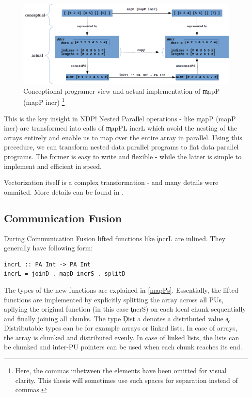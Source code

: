     \begin{figure}[h!]
        \begin{center}
        \includegraphics[width=\linewidth]{mapP.png}
        \caption{Conceptional programer view and actual implementation of \c{mapP (mapP incr)}
        \footnote{Here, the commas inbetween the elements have been omitted for visual clarity.
        This thesis will sometimes use such spaces for separation
        instead of commas.
        }
        }
        \label{figure:mapP}
        \end{center}
    \end{figure}
    
    This is the key insight in NDP! Nested Parallel operations - like \c{mapP (mapP incr)} are
    transformed into calls of \c{mapPL incrL} which avoid the nesting of
    the arrays entirely and enable us to map over the entire array in parallel.
    Using this precedure, we can transform nested data parallel programs
    to flat data parallel programs. The former is easy to write and flexible
    - while the latter is simple to implement and efficient in speed.
            
    Vectorization itself is a complex transformation - and many details were ommited.
    More details can be found in \cite{Harness2008}.
    
  \subsection{Communication Fusion}
    During Communication Fusion lifted functions like \c{incrL} are inlined.
    They generally have following form:
    \begin{lstlisting}
incrL :: PA Int -> PA Int
incrL = joinD . mapD incrS . splitD
    \end{lstlisting}
    The types of the new functions are explained in \ref{mapPs}.
    Essentially, the lifted functions are implemented by explicitly
    splitting the array across all PUs, apllying the original
    function (in this case \c{incrS}) on each local chunk sequentially and finally joining all chunks.
    The type \c{Dist a} denotes a distributed value \c{a}.
    Distributable types can be for example arrays or linked lists.
    In case of arrays, the array is chunked and distributed evenly.
    In case of linked lists, the lists can be chunked and
    inter-PU pointers can be used when each chunk reaches its end.
    
